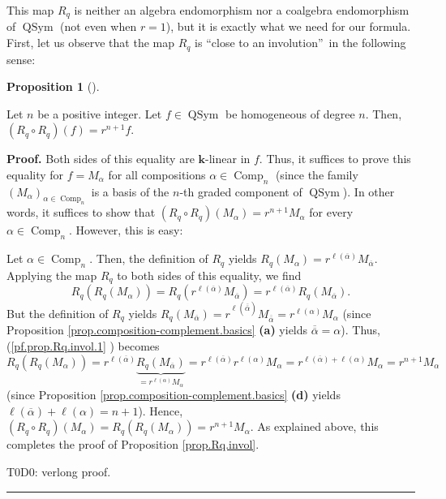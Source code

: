 \documentclass[numbers=enddot,12pt,final,onecolumn,notitlepage]{scrartcl}%
\theoremstyle{definition}
\newtheorem{prop}[theo]{Proposition}
\newenvironment{proposition}[1][]
{\begin{prop}[#1]\begin{leftbar}}
{\end{leftbar}\end{prop}}
\newenvironment{proof}[1][Proof]{\noindent\textbf{#1.} }{\ \rule{0.5em}{0.5em}}
\newenvironment{verlong}{}{}
\begin{document}
This map $R_{q}$ is neither an algebra endomorphism nor a coalgebra
endomorphism of $\operatorname*{QSym}$ (not even when $r=1$), but it is
exactly what we need for our formula. First, let us observe that the map
$R_{q}$ is \textquotedblleft close to an involution\textquotedblright\ in the
following sense:

\begin{proposition}
\label{prop.Rq.invol}Let $n$ be a positive integer. Let $f\in
\operatorname*{QSym}$ be homogeneous of degree $n$. Then, $\left(  R_{q}\circ
R_{q}\right)  \left(  f\right)  =r^{n+1}f$.
\end{proposition}

\begin{proof}
Both sides of this equality are $\mathbf{k}$-linear in $f$. Thus, it suffices
to prove this equality for $f=M_{\alpha}$ for all compositions $\alpha
\in\operatorname*{Comp}\nolimits_{n}$ (since the family $\left(  M_{\alpha
}\right)  _{\alpha\in\operatorname*{Comp}\nolimits_{n}}$ is a basis of the
$n$-th graded component of $\operatorname*{QSym}$). In other words, it
suffices to show that $\left(  R_{q}\circ R_{q}\right)  \left(  M_{\alpha
}\right)  =r^{n+1}M_{\alpha}$ for every $\alpha\in\operatorname*{Comp}%
\nolimits_{n}$. However, this is easy:

Let $\alpha\in\operatorname*{Comp}\nolimits_{n}$. Then, the definition of
$R_{q}$ yields $R_{q}\left(  M_{\alpha}\right)  =r^{\ell\left(  \overline
{\alpha}\right)  }M_{\overline{\alpha}}$. Applying the map $R_{q}$ to both
sides of this equality, we find%
\begin{equation}
R_{q}\left(  R_{q}\left(  M_{\alpha}\right)  \right)  =R_{q}\left(
r^{\ell\left(  \overline{\alpha}\right)  }M_{\overline{\alpha}}\right)
=r^{\ell\left(  \overline{\alpha}\right)  }R_{q}\left(  M_{\overline{\alpha}%
}\right)  . \label{pf.prop.Rq.invol.1}%
\end{equation}
But the definition of $R_{q}$ yields $R_{q}\left(  M_{\overline{\alpha}%
}\right)  =r^{\ell\left(  \overline{\overline{\alpha}}\right)  }%
M_{\overline{\overline{\alpha}}}=r^{\ell\left(  \alpha\right)  }M_{\alpha}$
(since Proposition \ref{prop.composition-complement.basics} \textbf{(a)}
yields $\overline{\overline{\alpha}}=\alpha$). Thus, (\ref{pf.prop.Rq.invol.1}%
) becomes%
\[
R_{q}\left(  R_{q}\left(  M_{\alpha}\right)  \right)  =r^{\ell\left(
\overline{\alpha}\right)  }\underbrace{R_{q}\left(  M_{\overline{\alpha}%
}\right)  }_{=r^{\ell\left(  \alpha\right)  }M_{\alpha}}=r^{\ell\left(
\overline{\alpha}\right)  }r^{\ell\left(  \alpha\right)  }M_{\alpha}%
=r^{\ell\left(  \overline{\alpha}\right)  +\ell\left(  \alpha\right)
}M_{\alpha}=r^{n+1}M_{\alpha}%
\]
(since Proposition \ref{prop.composition-complement.basics} \textbf{(d)}
yields $\ell\left(  \overline{\alpha}\right)  +\ell\left(  \alpha\right)
=n+1$). Hence, $\left(  R_{q}\circ R_{q}\right)  \left(  M_{\alpha}\right)
=R_{q}\left(  R_{q}\left(  M_{\alpha}\right)  \right)  =r^{n+1}M_{\alpha}$. As
explained above, this completes the proof of Proposition \ref{prop.Rq.invol}.
\qedhere


\begin{verlong}
T0D0: verlong proof.
\end{verlong}
\end{proof}
\end{document}
